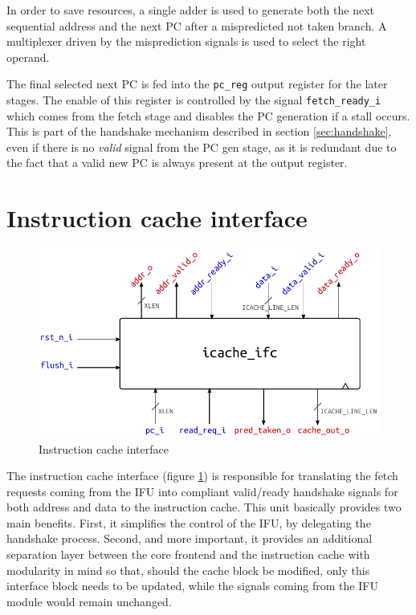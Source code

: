 In order to save resources, a single adder is used to generate both the next sequential address and the next \ac{PC} after a mispredicted not taken branch. A multiplexer driven by the misprediction signals is used to select the right operand.

The final selected next \ac{PC} is fed into the \texttt{pc\_reg} output register for the later stages. The enable of this register is controlled by the signal \texttt{fetch\_ready\_i} which comes from the fetch stage and disables the \ac{PC} generation if a stall occurs. This is part of the handshake mechanism described in section \ref{sec:handshake}, even if there is no \emph{valid} signal from the \ac{PC} gen stage, as it is redundant due to the fact that a valid new \ac{PC} is always present at the output register.

\section{Instruction cache interface}
\begin{figure}[hbt]
  \centering
  \includegraphics{img/icache_ifc.pdf}
  \caption{Instruction cache interface}
  \label{fig:icache_ifc}
\end{figure}
The instruction cache interface (figure \ref{fig:icache_ifc}) is responsible for translating the fetch requests coming from the \ac{IFU} into compliant valid/ready handshake signals for both address and data to the instruction cache. This unit basically provides two main benefits. First, it simplifies the control of the \ac{IFU}, by delegating the handshake process. Second, and more important, it provides an additional separation layer between the core frontend and the instruction cache with modularity in mind so that, should the cache block be modified, only this interface block needs to be updated, while the signals coming from the \ac{IFU} module would remain unchanged.

